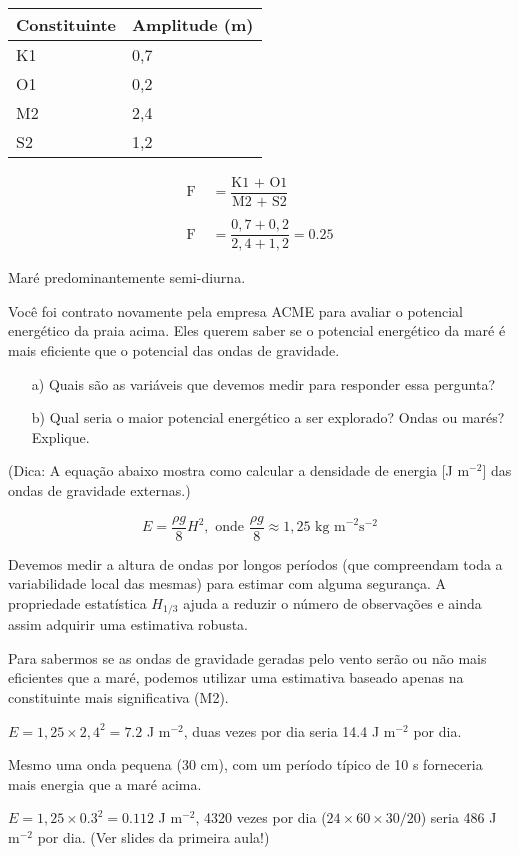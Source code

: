 \documentclass[letterpaper,portuguese,12pt,pdftex]{exam}
\begin{document}
\begin{questions}
\begin{center}
\begin{tabular}{ll}
Constituinte & Amplitude (m)\\
\hline
K1 & 0,7 \\
O1 & 0,2 \\
M2 & 2,4 \\
S2 & 1,2 \\
\hline
\end{tabular}
\end{center}


\begin{solution}
  \begin{align*}
    \text{F} &= \dfrac{\text{K1 + O1}}{\text{M2 + S2}} \\
    \quad \\
    \text{F} &= \dfrac{0,7 + 0,2}{2,4 + 1,2} = 0.25
  \end{align*}

  Maré predominantemente semi-diurna.
\end{solution}

\question[3]
Você foi contrato novamente pela empresa ACME\circledR{} para avaliar o
potencial energético da praia acima.  Eles querem saber se o potencial
energético da maré é mais eficiente que o potencial das ondas de gravidade.

\begin{itemize}
  \item[a)] Quais são as variáveis que devemos medir para responder essa pergunta?
  \item[b)] Qual seria o maior potencial energético a ser explorado?
            Ondas ou marés? Explique.
\end{itemize}

(Dica: A equação abaixo mostra como calcular a densidade de energia [J m$^{-2}$]
das ondas de gravidade externas.)

\[
  E = \dfrac{\rho g}{8} H^2, \text{ onde } \dfrac{\rho g}{8} \approx 1,25 \text{ kg m}^{-2}\text{s}^{-2}
\]

\begin{solution}
  Devemos medir a altura de ondas por longos períodos (que compreendam toda a
  variabilidade local das mesmas) para estimar com alguma segurança.  A
  propriedade estatística $H_{1/3}$ ajuda a reduzir o número de observações e
  ainda assim adquirir uma estimativa robusta.

  Para sabermos se as ondas de gravidade geradas pelo vento serão ou não mais
  eficientes que a maré, podemos utilizar uma estimativa baseado apenas na
  constituinte mais significativa (M2).

  $E = 1,25 \times 2,4^2 = 7.2$ J m$^{-2}$, duas vezes por dia seria
  14.4 J m$^{-2}$ por dia.

  Mesmo uma onda pequena (30 cm), com um período típico de 10 s forneceria mais
  energia que a maré acima.

  $E = 1,25 \times 0.3^2 = 0.112$ J m$^{-2}$, 4320 vezes por dia
  ($24 \times60 \times 30 / 20$) seria 486 J m$^{-2}$ por dia.
  (Ver slides da primeira aula!)
\end{solution}

\end{questions}
\end{document}

